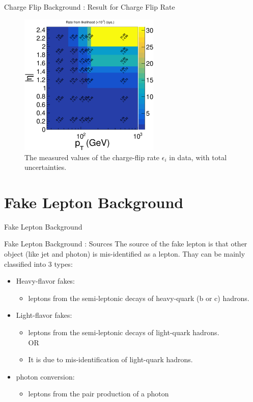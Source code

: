 \documentclass[mathserif,serif]{beamer}
\begin{document}
\begin{frame}{Charge Flip Background : Result for Charge Flip Rate}
\begin{figure}
\centering
\includegraphics[width=0.6\textwidth]{data/plot/charge_flip/FitPlots/data_cf_rate_tot.eps}
\caption{The measured values of the charge-flip rate $\epsilon_i$ in data, with total uncertainties.}
\label{fig:charge_flip_data_tot}
\end{figure}
\end{frame}

\section{Fake Lepton Background}
\begin{frame}
\begin{center}
\huge
Fake Lepton Background
\end{center}
\end{frame}

\begin{frame}{Fake Lepton Background : Sources}
The source of the fake lepton is that other object (like jet and photon) is mis-identified as a lepton. Thay can be mainly classified into 3 types:
\begin{itemize}
\item Heavy-flavor fakes:
\begin{itemize}
\item leptons from the semi-leptonic decays of heavy-quark (b or c) hadrons.
\end{itemize}
\item Light-flavor fakes:
\begin{itemize}
\item leptons from the semi-leptonic decays of light-quark hadrons. \\ OR
\item It is due to mis-identification of light-quark hadrons.
\end{itemize}
\item photon conversion:
\begin{itemize}
\item leptons from the pair production of a photon
\end{itemize}
\end{itemize}
\end{frame}
\end{document}
